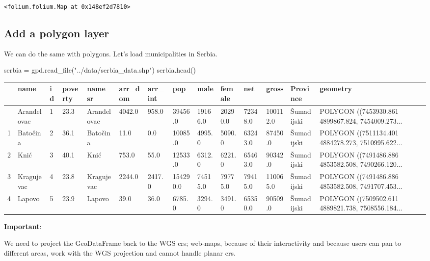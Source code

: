 \documentclass[
  letterpaper,
  DIV=11,
  numbers=noendperiod]{scrreprt}
\newenvironment{Shaded}{\begin{snugshade}}{\end{snugshade}}
\newcommand{\NormalTok}[1]{\textcolor[rgb]{0.00,0.23,0.31}{#1}}
\newcommand{\OperatorTok}[1]{\textcolor[rgb]{0.37,0.37,0.37}{#1}}
\newcommand{\StringTok}[1]{\textcolor[rgb]{0.13,0.47,0.30}{#1}}
\begin{document}
\begin{verbatim}
<folium.folium.Map at 0x148ef2d7810>
\end{verbatim}

\subsection{Add a polygon layer}\label{add-a-polygon-layer}

We can do the same with polygons. Let's load municipalities in Serbia.

\begin{Shaded}
\begin{Highlighting}[]
\NormalTok{serbia }\OperatorTok{=}\NormalTok{ gpd.read\_file(}\StringTok{"../data/serbia\_data.shp"}\NormalTok{)}
\NormalTok{serbia.head()}
\end{Highlighting}
\end{Shaded}

\begin{longtable}[]{@{}llllllllllllll@{}}
\toprule\noalign{}
& name & id & poverty & name\_sr & arr\_dom & arr\_int & pop & male &
female & net & gross & Province & geometry \\
\midrule\noalign{}
\endhead
\bottomrule\noalign{}
\endlastfoot
0 & Aranđelovac & 1 & 23.3 & Aranđelovac & 4042.0 & 958.0 & 39456.0 &
19166.0 & 20290.0 & 72348.0 & 100112.0 & Šumadijski & POLYGON
((7453930.861 4899867.824, 7454009.273... \\
1 & Batočina & 2 & 36.1 & Batočina & 11.0 & 0.0 & 10085.0 & 4995.0 &
5090.0 & 63243.0 & 87450.0 & Šumadijski & POLYGON ((7511134.401
4884278.273, 7510995.622... \\
2 & Knić & 3 & 40.1 & Knić & 753.0 & 55.0 & 12533.0 & 6312.0 & 6221.0 &
65463.0 & 90342.0 & Šumadijski & POLYGON ((7491486.886 4853582.508,
7490266.120... \\
3 & Kragujevac & 4 & 23.8 & Kragujevac & 2244.0 & 2417.0 & 154290.0 &
74515.0 & 79775.0 & 79415.0 & 110065.0 & Šumadijski & POLYGON
((7491486.886 4853582.508, 7491707.453... \\
4 & Lapovo & 5 & 23.9 & Lapovo & 39.0 & 36.0 & 6785.0 & 3294.0 & 3491.0
& 65350.0 & 90509.0 & Šumadijski & POLYGON ((7509502.611 4889821.738,
7508556.184... \\
\end{longtable}

\textbf{Important}:

We need to project the GeoDataFrame back to the WGS crs; web-maps,
because of their interactivity and because users can pan to different
areas, work with the WGS projection and cannot handle planar crs.
\end{document}
